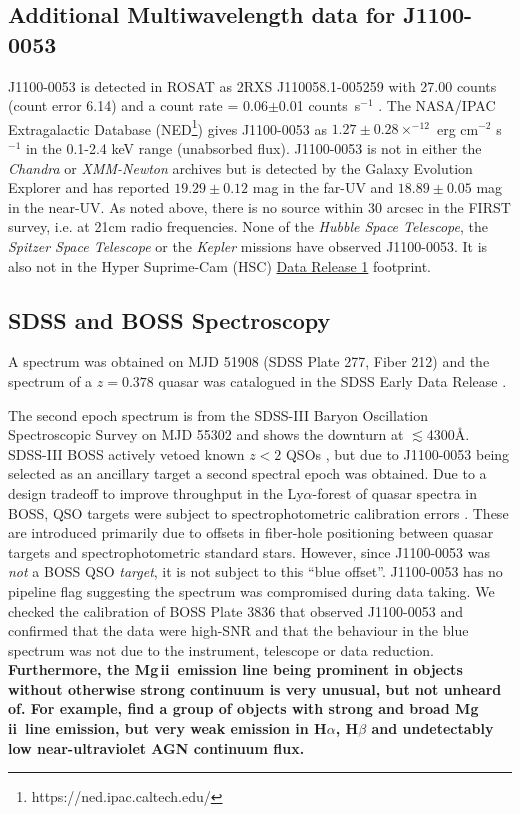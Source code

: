 \documentclass[a4paper,fleqn,usenatbib]{mnras}
\begin{document}
\subsection{Additional Multiwavelength data for J1100-0053}
J1100-0053 is detected in ROSAT as 2RXS J110058.1-005259 with 27.00
counts (count error 6.14) and a count rate = 0.06$\pm$0.01
counts~s$^{-1}$ \cite{Boller2016}. The NASA/IPAC Extragalactic
Database (NED\footnote{https://ned.ipac.caltech.edu/}) gives
J1100-0053 as $1.27\pm0.28 \times^{-12}$ erg cm$^{-2}$ s$^{-1}$ in the
0.1-2.4 keV range (unabsorbed flux). J1100-0053 is not in either the
{\it Chandra} or {\it XMM-Newton} archives but is detected by the
Galaxy Evolution Explorer \citep[GALEX; ][]{Martin2005, Morrissey2007}
and has reported $19.29\pm0.12$ mag in the far-UV and $18.89\pm0.05$
mag in the near-UV. As noted above, there is no source within 30
arcsec in the FIRST survey, i.e. at 21cm radio frequencies. None of
the {\it Hubble Space Telescope}, the {\it Spitzer Space Telescope} or
the {\it Kepler} missions have observed J1100-0053.  It is also not in
the Hyper Suprime-Cam (HSC)
\href{https://hsc-release.mtk.nao.ac.jp/doc/}{Data Release 1}
\citep{Aihara2017} footprint.

\subsection{SDSS and BOSS Spectroscopy}
A spectrum was obtained on MJD 51908 (SDSS Plate 277, Fiber 212) and
the spectrum of a $z=0.378$ quasar was catalogued in the SDSS Early
Data Release \citep{Stoughton2002, Schneider2002}. 

The second epoch spectrum is from the SDSS-III Baryon Oscillation
Spectroscopic Survey \citep[BOSS; ][]{Dawson2013} on MJD 55302 and shows the
downturn at $\lesssim$4300\AA. SDSS-III BOSS actively vetoed known
$z<2$ QSOs \citep{Ross2012}, but due to J1100-0053 being selected as
an ancillary target \citep[via a white dwarf program;][]{Kepler2015,
Kepler2016} a second spectral epoch was obtained. Due to a design
tradeoff to improve throughput in the Ly$\alpha$-forest of quasar
spectra in BOSS, QSO targets were subject to spectrophotometric
calibration errors \citep{Margala2016}. These are introduced primarily
due to offsets in fiber-hole positioning between quasar targets and
spectrophotometric standard stars. However, since J1100-0053 was {\it
not} a BOSS QSO {\it target}, it is not subject to this ``blue
offset''. J1100-0053 has no pipeline flag suggesting the spectrum was
compromised during data taking. We checked the calibration of BOSS
Plate 3836 that observed J1100-0053 and confirmed that the data were
high-SNR and that the behaviour in the blue spectrum was not due to
the instrument, telescope or data reduction.
{\bf Furthermore, the Mg\,{\sc ii}\ emission line being prominent in
objects without otherwise strong continuum is very unusual, but not
unheard of.  For example, \citet{Roig2014} find a group of objects
with strong and broad Mg\,{\sc ii}\ line emission, but very weak
emission in H$\alpha$, H$\beta$ and undetectably low near-ultraviolet
AGN continuum flux.}
\end{document}
